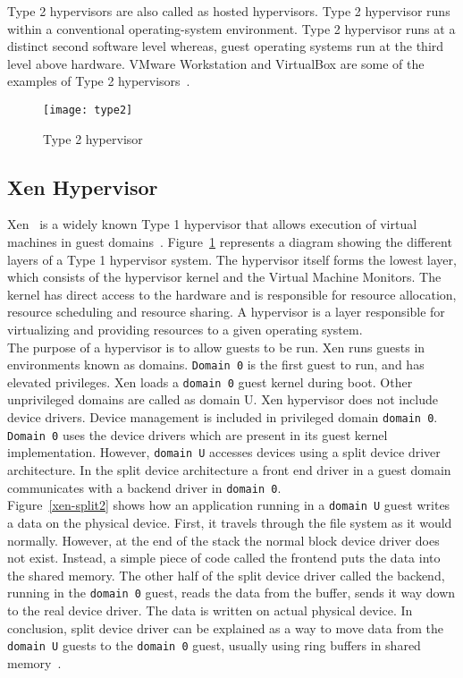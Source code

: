 \begin{description}
\item Type 2 hypervisors are also called as hosted hypervisors. Type 2 hypervisor runs within a conventional operating-system environment. Type 2 hypervisor runs at a distinct second software level whereas, guest operating systems run at the third level above hardware. VMware Workstation and VirtualBox are some of the examples of Type 2 hypervisors~\cite{Sugerman:2001:VID:647055.715774, citeulike:3149886}.
\end{description}
\begin{figure}[!ht]
\centering
\texttt{[image: type2]}
\caption{Type 2 hypervisor}
\label{fig:Type 2 hypervisor}
\end{figure}

\subsection{Xen Hypervisor}
Xen~\cite{Barham:2003:XAV:1165389.945462} is a widely known Type 1 hypervisor that allows execution of virtual machines in guest domains~\cite{King_operatingsystem}. Figure~\ref{fig:Type 2 hypervisor} represents a diagram showing the different layers of a Type 1 hypervisor system. The hypervisor itself forms the lowest layer, which consists of the hypervisor kernel and the Virtual Machine Monitors. The kernel has direct access to the hardware and is responsible for resource allocation, resource scheduling and resource sharing. A hypervisor is a layer responsible for virtualizing and providing resources to a given operating system.
\\[3mm]
The purpose of a hypervisor is to allow guests to be run. Xen runs guests in environments known as domains. \texttt{Domain 0} is the first guest to run, and has elevated privileges. Xen loads a \texttt{domain 0} guest kernel during boot. Other unprivileged domains are called as domain U. Xen hypervisor does not include device drivers. Device management is included in privileged domain \texttt{domain 0}. \texttt{Domain 0} uses the device drivers which are present in its guest kernel implementation. However, \texttt{domain U} accesses devices using a split device driver architecture. In the split device architecture a front end driver in a guest domain communicates with a backend driver in \texttt{domain 0}.
\\
Figure~\ref{xen-split2} shows how an application running in a \texttt{domain U} guest writes a data on the physical device. First, it travels through the file system as it would normally. However, at the end of the stack the normal block device driver does not exist. Instead, a simple piece of code called the frontend puts the data into the shared memory. The other half of the split device driver called the backend, running in the \texttt{domain 0} guest, reads the data from the buffer, sends it way down to the real device driver. The data is written on actual physical device. In conclusion, split device driver can be explained as a way to move data from the \texttt{domain U} guests to the \texttt{domain 0} guest, usually using ring buffers in shared memory~\cite{Chisnall:2007:DGX:1407351}.
